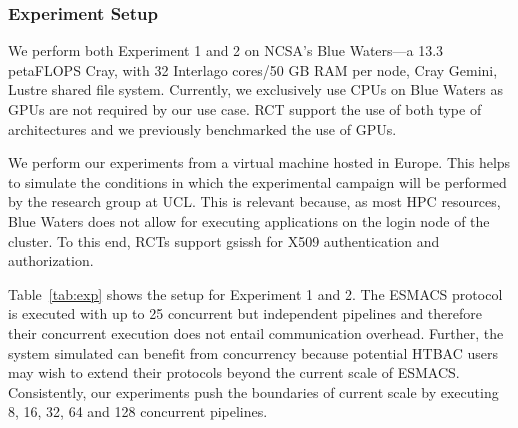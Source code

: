 \subsubsection{Experiment Setup}\label{ssec:exp_setup}

We perform both Experiment 1 and 2 on NCSA's Blue Waters---a 13.3 petaFLOPS
Cray, with 32 Interlago cores/50 GB RAM per node, Cray Gemini, Lustre shared
file system. Currently, we exclusively use CPUs on Blue Waters as GPUs are
not required by our use case. RCT support the use of both type of
architectures and we previously benchmarked the use of GPUs.

We perform our experiments from a virtual machine hosted in Europe. This
helps to simulate the conditions in which the experimental campaign will be
performed by the research group at UCL\@. This is relevant because, as most
HPC resources, Blue Waters does not allow for executing applications on the
login node of the cluster. To this end, RCTs support \textmd{gsissh} for X509
authentication and authorization.

Table~\ref{tab:exp} shows the setup for Experiment 1 and 2. The ESMACS
protocol is executed with up to 25 concurrent but independent pipelines and
therefore their concurrent execution does not entail communication overhead.
Further, the system simulated can benefit from concurrency because potential
HTBAC users may wish to extend their protocols beyond the current scale of
ESMACS\@. Consistently, our experiments push the boundaries of current scale
by executing 8, 16, 32, 64 and 128 concurrent pipelines.

